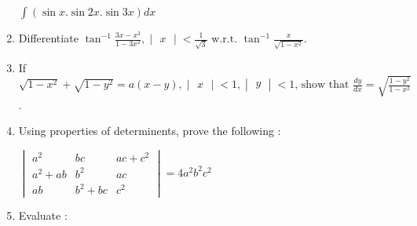 \documentclass[12pt,-letter paper]{article}
\providecommand{\brak}[1]{\ensuremath{\left (#1\right)}}
\theoremstyle{remark}
\newcommand{\mydet}[1]{\ensuremath{\begin{vmatrix}#1\end{vmatrix}}}
\begin{document}
\begin{enumerate}
	$\int \brak{\sin x . \sin 2x . \sin 3x}dx$
\item  Differentiate $\tan^{-1}\frac{3x - x^3}{1 - 3x^2}, \mydet{x} < \frac{1}{\sqrt{3}} \text{ w.r.t. } \tan^{-1}\frac{x}{\sqrt{1 - x^2}}$.
\item  If $\sqrt{1 - x^2} + \sqrt{1 - y^2} = a\brak{x - y}, \mydet{x}< 1, \mydet{y}< 1\text{, show that  }\frac{dy}{dx} = \sqrt{\frac{1 -y^2}{1 - x^2}}$.
\item  Using properties of determinents, prove the following :


	$\begin{vmatrix}
		a^2 & bc & ac + c^2\\
		a^2 + ab & b^2 & ac\\
		ab & b^2 + bc & c^2
	\end{vmatrix}
	= 4a^2b^2c^2$
\item  Evaluate :



\end{enumerate}
\end{document}
